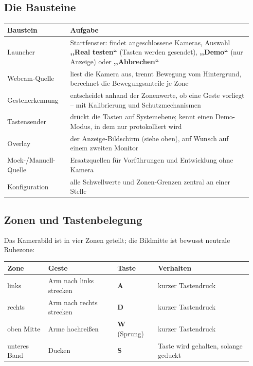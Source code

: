 \documentclass[12pt,a4paper]{article}
\begin{document}
\subsection{Die Bausteine}

\begin{tabularx}{\textwidth}{@{}l Y@{}}
\toprule
Baustein & Aufgabe \\
\midrule
Launcher & Startfenster: findet angeschlossene Kameras, Auswahl \textbf{,,Real testen``} (Tasten werden gesendet), \textbf{,,Demo``} (nur Anzeige) oder \textbf{,,Abbrechen``} \\
Webcam-Quelle & liest die Kamera aus, trennt Bewegung vom Hintergrund, berechnet die Bewegungsanteile je Zone \\
Gestenerkennung & entscheidet anhand der Zonenwerte, ob eine Geste vorliegt -- mit Kalibrierung und Schutzmechanismen \\
Tastensender & drückt die Tasten auf Systemebene; kennt einen Demo-Modus, in dem nur protokolliert wird \\
Overlay & der Anzeige-Bildschirm (siehe oben), auf Wunsch auf einem zweiten Monitor \\
Mock-/Manuell-Quelle & Ersatzquellen für Vorführungen und Entwicklung ohne Kamera \\
Konfiguration & alle Schwellwerte und Zonen-Grenzen zentral an einer Stelle \\
\bottomrule
\end{tabularx}

\subsection{Zonen und Tastenbelegung}

Das Kamerabild ist in vier Zonen geteilt; die Bildmitte ist bewusst neutrale Ruhezone:

\begin{tabularx}{\textwidth}{@{}l Y l Y@{}}
\toprule
Zone & Geste & Taste & Verhalten \\
\midrule
links & Arm nach links strecken & \textbf{A} & kurzer Tastendruck \\
rechts & Arm nach rechts strecken & \textbf{D} & kurzer Tastendruck \\
oben Mitte & Arme hochreißen & \textbf{W} (Sprung) & kurzer Tastendruck \\
unteres Band & Ducken & \textbf{S} & Taste wird gehalten, solange geduckt \\
\bottomrule
\end{tabularx}
\end{document}
